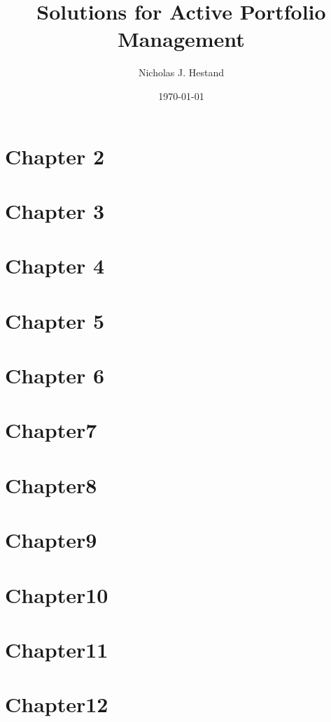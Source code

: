 \documentclass[10pt]{article}
\begin{document}
  \title{Solutions for Active Portfolio Management}
  \author{Nicholas J. Hestand}
  \date{\today}
  
  \maketitle
  
  \section*{Chapter 2}
  
  
  \newpage
  \section*{Chapter 3}
  
  
  \newpage
  \section*{Chapter 4}
  
  
  \newpage
  \section*{Chapter 5}
  
  
  \newpage
  \section*{Chapter 6}
  
  
  \newpage
  \section*{Chapter7}
  
  
  \newpage
  \section*{Chapter8}
  
  
  \newpage
  \section*{Chapter9}
  
  
  \newpage
  \section*{Chapter10}
  
  
  \newpage
  \section*{Chapter11}
  
  
  \newpage
  \section*{Chapter12}
  
\end{document}
